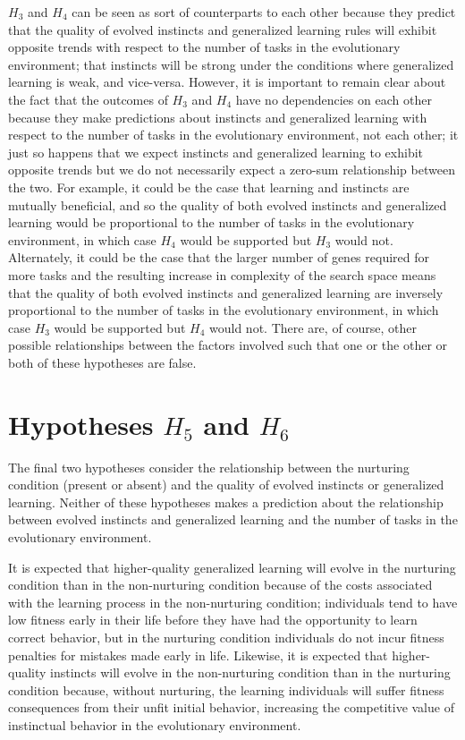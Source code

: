 \documentclass[master]{outhesis}
\begin{document}
$H_3$ and $H_4$ can be seen as sort of counterparts to each other 
because they predict that the quality of evolved instincts and generalized learning rules will exhibit opposite trends with respect to the number of tasks in the evolutionary environment; 
that instincts will be strong under the conditions where generalized learning is weak, and vice-versa.
However, it is important to remain clear about the fact that the outcomes of $H_3$ and $H_4$ have no dependencies on each other because they make predictions about instincts and generalized learning with respect to the number of tasks in the evolutionary environment, not each other;
it just so happens that we expect instincts and generalized learning to exhibit opposite trends
but we do not necessarily expect a zero-sum relationship between the two.
For example, it could be the case that learning and instincts are mutually beneficial,
and so the quality of both evolved instincts and generalized learning would be proportional to the number of tasks in the evolutionary environment,
in which case $H_4$ would be supported but $H_3$ would not.
Alternately, it could be the case that
the larger number of genes required for more tasks and the resulting increase in complexity of the search space means that
the quality of both evolved instincts and generalized learning are inversely proportional to the number of tasks in the evolutionary environment,
in which case $H_3$ would be supported but $H_4$ would not.
There are, of course, other possible relationships between the factors involved such that one or the other or both of these hypotheses are false.

\section{Hypotheses $H_5$ and $H_6$}

The final two hypotheses consider the relationship between the nurturing condition (present or absent) and the quality of evolved instincts or generalized learning. Neither of these hypotheses makes a prediction about the relationship between evolved instincts and generalized learning and the number of tasks in the evolutionary environment.

It is expected that higher-quality generalized learning will evolve in the nurturing condition than in the non-nurturing condition because of the costs associated with the learning process in the non-nurturing condition; individuals tend to have low fitness early in their life before they have had the opportunity to learn correct behavior, but in the nurturing condition individuals do not incur fitness penalties for mistakes made early in life.
Likewise, it is expected that higher-quality instincts will evolve in the non-nurturing condition than in the nurturing condition because, without nurturing, the learning individuals will suffer fitness consequences from their unfit initial behavior, increasing the competitive value of instinctual behavior in the evolutionary environment.
\end{document}
